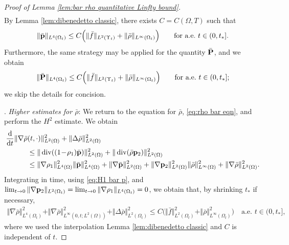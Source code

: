 \documentclass[11pt,a4paper,reqno]{amsart}
\theoremstyle{remark}
\theoremstyle{definition}
\numberwithin{equation}{section}
\DeclareMathOperator{\dv}{div}
\renewcommand{\P}{{\bf P}}
\newcommand{\p}{{\bf p}}
\newcommand{\der}{\mathrm{d}}
\begin{document}
\begin{proof}[Proof of Lemma \ref{lem:bar rho quantitative Linfty bound}]
\begin{equation}
\begin{aligned}
    \end{aligned}
\end{equation}
By Lemma \ref{lem:dibenedetto classic}, there exists $C=C(\Omega,T)$ such that 
\begin{equation}\label{eq:bar p all Lq bounds}
    \Vert \bar{\p} \Vert_{L^4(\Omega_t)} \leq C \Big( \Vert \bar{f} \Vert_{L^2(\Upsilon_t)} + \Vert \bar{\rho} \Vert_{L^\infty(\Omega_t)} \Big) \qquad \text{for a.e.~} t \in (0,t_{*}]. 
\end{equation}
Furthermore, the same strategy may be applied for the quantity $\bar{\P}$, and we obtain 
\begin{equation}\label{eq:bar P matrix all Lq bounds}
    \Vert \bar{\P} \Vert_{L^4(\Omega_t)} \leq C \Big( \Vert \bar{f} \Vert_{L^2(\Upsilon_t)} + \Vert \bar{\rho} \Vert_{L^\infty(\Omega_t)} \Big) \qquad \text{for a.e.~} t \in (0,t_{*}]; 
\end{equation}
we skip the details for concision. 



\smallskip 

. \textit{Higher estimates for $\bar{\rho}$}: We return to the equation for $\bar{\rho}$, \eqref{eq:rho bar eqn}, and perform the $H^2$ estimate. We obtain 
\begin{equation*}
\begin{aligned}
    \frac{\der}{\der t}\Vert \nabla \bar{\rho}&(t,\cdot) \Vert^2_{L^2(\Omega)} + \Vert \Delta \bar{\rho} \Vert^2_{L^2(\Omega)} \\ 
    &\leq \Vert \dv((1\!-\!\rho_1)\bar{\p}) \Vert_{L^2(\Omega)}^2 + \Vert \dv(\bar{\rho} \p_2 ) \Vert^2_{L^2(\Omega)} \\ 
    &\leq \Vert \nabla \rho_1 \Vert^2_{L^4(\Omega)} \Vert \bar{\p} \Vert^2_{L^4(\Omega)} + \Vert \nabla \bar{\p} \Vert^2_{L^2(\Omega)} + \Vert \nabla \p_2 \Vert^2_{L^2(\Omega)} \Vert \bar{\rho} \Vert^2_{L^\infty(\Omega)} + \Vert \nabla \bar{\rho} \Vert^2_{L^2(\Omega)}. 
    \end{aligned}
\end{equation*}
Integrating in time, using \eqref{eq:H1 bar p}, and $\lim_{t \to 0} \Vert \nabla \p_2 \Vert_{L^2(\Omega_t)}=\lim_{t \to 0} \Vert \nabla \rho_1 \Vert_{L^4(\Omega_t)} = 0$, we obtain that, by shrinking $t_*$ if necessary, 
\begin{equation}\label{eq:H2 bar rho}
    \begin{aligned}
        \Vert \nabla \bar{\rho} \Vert^2_{L^4(\Omega_t)} +   \Vert \nabla \bar{\rho} \Vert^2_{L^\infty(0,t;L^2(\Omega))} + \Vert \Delta \bar{\rho} \Vert^2_{L^2(\Omega_t)} \leq C \Big( \Vert \bar{f} \Vert_{L^2(\Omega_t)}^2 + \Vert \bar{\rho} \Vert_{L^\infty(\Omega_t)}^2 \Big) \quad \text{a.e.~}t \in (0,t_*], 
    \end{aligned}
\end{equation}
where we used the interpolation Lemma \ref{lem:dibenedetto classic} and $C$ is independent of $t$. 



\end{proof}
\end{document}
